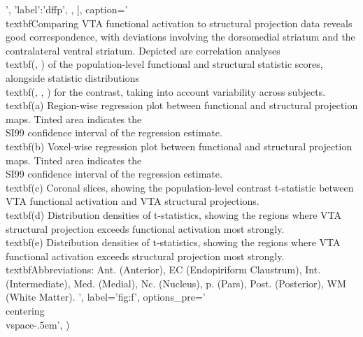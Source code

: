 \begin{sansmath}
{{                                ',
                        'label':'dffp',
                        },
                ],
        caption='
                \\textbf{Comparing VTA functional activation to structural projection data reveals good correspondence, with deviations involving the dorsomedial striatum and the contralateral ventral striatum.}
                Depicted are correlation analyses \\textbf{(, )} of the population-level functional and structural statistic scores, alongside statistic distributions \\textbf{(, , )} for the contrast, taking into account variability across subjects.
                \\textbf{(a)}
                        Region-wise regression plot between functional and structural projection maps.
                        Tinted area indicates the \\SI{99}{\percent} confidence interval of the regression estimate.
                \\textbf{(b)}
                        Voxel-wise regression plot between functional and structural projection maps.
                        Tinted area indicates the \\SI{99}{\percent} confidence interval of the regression estimate.
                \\textbf{(c)}
                        Coronal slices, showing the population-level contrast t-statistic between VTA functional activation and VTA structural projections.
                \\textbf{(d)}
                        Distribution densities of t-statistics, showing the regions where VTA structural projection exceeds functional activation most strongly.
                \\textbf{(e)}
                        Distribution densities of t-statistics, showing the regions where VTA functional activation exceeds structural projection most strongly.
                \\textbf{Abbreviations:}
                        Ant. (Anterior),
                        EC (Endopiriform Claustrum),
                        Int. (Intermediate),
                        Med. (Medial),
                        Nc. (Nucleus),
                        p. (Pars),
                        Post. (Posterior),
                        WM (White Matter).
                ',
        label='fig:f',
        options_pre='\\centering\n\\vspace{-.5em}',
        )}
\end{sansmath}

